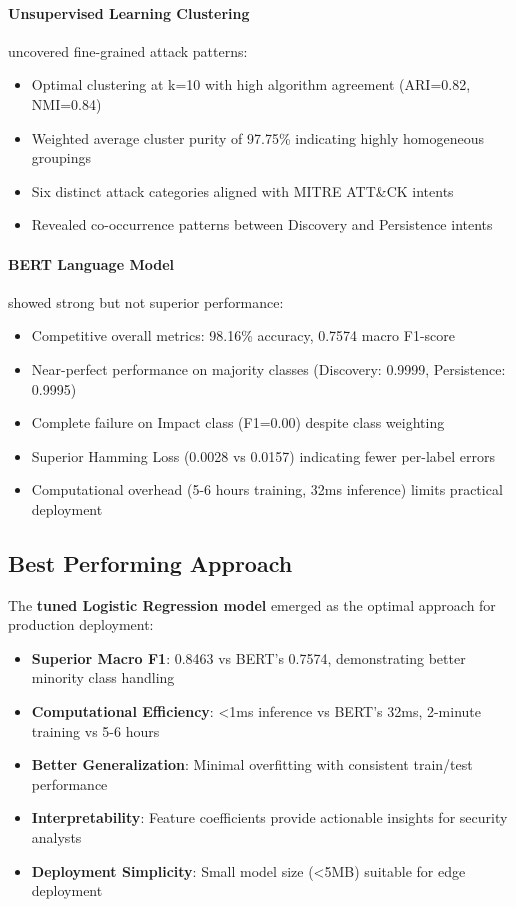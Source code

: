 \documentclass[acmlarge,screen,nonacm]{acmart}
\begin{document}
\paragraph{Unsupervised Learning Clustering} uncovered fine-grained attack patterns:
\begin{itemize}
    \item Optimal clustering at k=10 with high algorithm agreement (ARI=0.82, NMI=0.84)
    \item Weighted average cluster purity of 97.75\% indicating highly homogeneous groupings
    \item Six distinct attack categories aligned with MITRE ATT\&CK intents
    \item Revealed co-occurrence patterns between Discovery and Persistence intents
\end{itemize}

\paragraph{BERT Language Model} showed strong but not superior performance:
\begin{itemize}
    \item Competitive overall metrics: 98.16\% accuracy, 0.7574 macro F1-score
    \item Near-perfect performance on majority classes (Discovery: 0.9999, Persistence: 0.9995)
    \item Complete failure on Impact class (F1=0.00) despite class weighting
    \item Superior Hamming Loss (0.0028 vs 0.0157) indicating fewer per-label errors
    \item Computational overhead (5-6 hours training, 32ms inference) limits practical deployment
\end{itemize}

\subsection{Best Performing Approach}

The \textbf{tuned Logistic Regression model} emerged as the optimal approach for production deployment:

\begin{itemize}
    \item \textbf{Superior Macro F1}: 0.8463 vs BERT's 0.7574, demonstrating better minority class handling
    \item \textbf{Computational Efficiency}: <1ms inference vs BERT's 32ms, 2-minute training vs 5-6 hours
    \item \textbf{Better Generalization}: Minimal overfitting with consistent train/test performance
    \item \textbf{Interpretability}: Feature coefficients provide actionable insights for security analysts
    \item \textbf{Deployment Simplicity}: Small model size (<5MB) suitable for edge deployment
\end{itemize}
\end{document}

